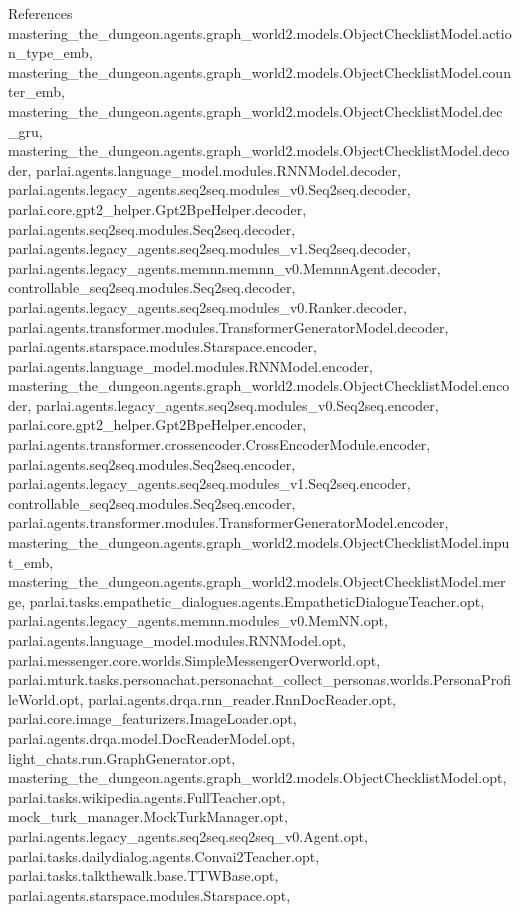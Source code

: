 References mastering\+\_\+the\+\_\+dungeon.\+agents.\+graph\+\_\+world2.\+models.\+Object\+Checklist\+Model.\+action\+\_\+type\+\_\+emb, mastering\+\_\+the\+\_\+dungeon.\+agents.\+graph\+\_\+world2.\+models.\+Object\+Checklist\+Model.\+counter\+\_\+emb, mastering\+\_\+the\+\_\+dungeon.\+agents.\+graph\+\_\+world2.\+models.\+Object\+Checklist\+Model.\+dec\+\_\+gru, mastering\+\_\+the\+\_\+dungeon.\+agents.\+graph\+\_\+world2.\+models.\+Object\+Checklist\+Model.\+decoder, parlai.\+agents.\+language\+\_\+model.\+modules.\+R\+N\+N\+Model.\+decoder, parlai.\+agents.\+legacy\+\_\+agents.\+seq2seq.\+modules\+\_\+v0.\+Seq2seq.\+decoder, parlai.\+core.\+gpt2\+\_\+helper.\+Gpt2\+Bpe\+Helper.\+decoder, parlai.\+agents.\+seq2seq.\+modules.\+Seq2seq.\+decoder, parlai.\+agents.\+legacy\+\_\+agents.\+seq2seq.\+modules\+\_\+v1.\+Seq2seq.\+decoder, parlai.\+agents.\+legacy\+\_\+agents.\+memnn.\+memnn\+\_\+v0.\+Memnn\+Agent.\+decoder, controllable\+\_\+seq2seq.\+modules.\+Seq2seq.\+decoder, parlai.\+agents.\+legacy\+\_\+agents.\+seq2seq.\+modules\+\_\+v0.\+Ranker.\+decoder, parlai.\+agents.\+transformer.\+modules.\+Transformer\+Generator\+Model.\+decoder, parlai.\+agents.\+starspace.\+modules.\+Starspace.\+encoder, parlai.\+agents.\+language\+\_\+model.\+modules.\+R\+N\+N\+Model.\+encoder, mastering\+\_\+the\+\_\+dungeon.\+agents.\+graph\+\_\+world2.\+models.\+Object\+Checklist\+Model.\+encoder, parlai.\+agents.\+legacy\+\_\+agents.\+seq2seq.\+modules\+\_\+v0.\+Seq2seq.\+encoder, parlai.\+core.\+gpt2\+\_\+helper.\+Gpt2\+Bpe\+Helper.\+encoder, parlai.\+agents.\+transformer.\+crossencoder.\+Cross\+Encoder\+Module.\+encoder, parlai.\+agents.\+seq2seq.\+modules.\+Seq2seq.\+encoder, parlai.\+agents.\+legacy\+\_\+agents.\+seq2seq.\+modules\+\_\+v1.\+Seq2seq.\+encoder, controllable\+\_\+seq2seq.\+modules.\+Seq2seq.\+encoder, parlai.\+agents.\+transformer.\+modules.\+Transformer\+Generator\+Model.\+encoder, mastering\+\_\+the\+\_\+dungeon.\+agents.\+graph\+\_\+world2.\+models.\+Object\+Checklist\+Model.\+input\+\_\+emb, mastering\+\_\+the\+\_\+dungeon.\+agents.\+graph\+\_\+world2.\+models.\+Object\+Checklist\+Model.\+merge, parlai.\+tasks.\+empathetic\+\_\+dialogues.\+agents.\+Empathetic\+Dialogue\+Teacher.\+opt, parlai.\+agents.\+legacy\+\_\+agents.\+memnn.\+modules\+\_\+v0.\+Mem\+N\+N.\+opt, parlai.\+agents.\+language\+\_\+model.\+modules.\+R\+N\+N\+Model.\+opt, parlai.\+messenger.\+core.\+worlds.\+Simple\+Messenger\+Overworld.\+opt, parlai.\+mturk.\+tasks.\+personachat.\+personachat\+\_\+collect\+\_\+personas.\+worlds.\+Persona\+Profile\+World.\+opt, parlai.\+agents.\+drqa.\+rnn\+\_\+reader.\+Rnn\+Doc\+Reader.\+opt, parlai.\+core.\+image\+\_\+featurizers.\+Image\+Loader.\+opt, parlai.\+agents.\+drqa.\+model.\+Doc\+Reader\+Model.\+opt, light\+\_\+chats.\+run.\+Graph\+Generator.\+opt, mastering\+\_\+the\+\_\+dungeon.\+agents.\+graph\+\_\+world2.\+models.\+Object\+Checklist\+Model.\+opt, parlai.\+tasks.\+wikipedia.\+agents.\+Full\+Teacher.\+opt, mock\+\_\+turk\+\_\+manager.\+Mock\+Turk\+Manager.\+opt, parlai.\+agents.\+legacy\+\_\+agents.\+seq2seq.\+seq2seq\+\_\+v0.\+Agent.\+opt, parlai.\+tasks.\+dailydialog.\+agents.\+Convai2\+Teacher.\+opt, parlai.\+tasks.\+talkthewalk.\+base.\+T\+T\+W\+Base.\+opt, parlai.\+agents.\+starspace.\+modules.\+Starspace.\+opt, 
